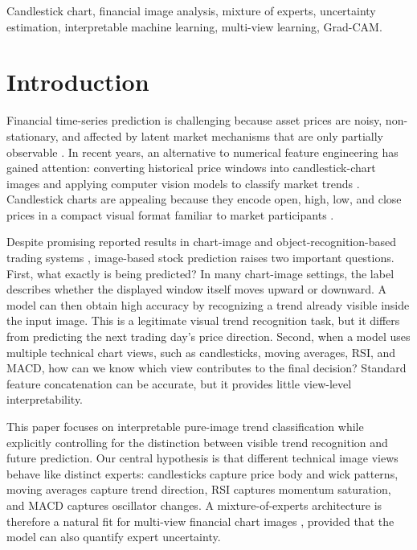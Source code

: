 ﻿\documentclass[conference]{IEEEtran}
\begin{document}
\begin{IEEEkeywords}
Candlestick chart, financial image analysis, mixture of experts, uncertainty estimation, interpretable machine learning, multi-view learning, Grad-CAM.
\end{IEEEkeywords}

\section{Introduction}

Financial time-series prediction is challenging because asset prices are noisy, non-stationary, and affected by latent market mechanisms that are only partially observable \cite{rouf2021stocksurvey,meng2021urts}. In recent years, an alternative to numerical feature engineering has gained attention: converting historical price windows into candlestick-chart images and applying computer vision models to classify market trends \cite{kusuma2019deepcandle,pizon2025image}. Candlestick charts are appealing because they encode open, high, low, and close prices in a compact visual format familiar to market participants \cite{mersal2023systematic}.

Despite promising reported results in chart-image and object-recognition-based trading systems \cite{nguyen2023object,temur2024comparison}, image-based stock prediction raises two important questions. First, what exactly is being predicted? In many chart-image settings, the label describes whether the displayed window itself moves upward or downward. A model can then obtain high accuracy by recognizing a trend already visible inside the input image. This is a legitimate visual trend recognition task, but it differs from predicting the next trading day's price direction. Second, when a model uses multiple technical chart views, such as candlesticks, moving averages, RSI, and MACD, how can we know which view contributes to the final decision? Standard feature concatenation can be accurate, but it provides little view-level interpretability.

This paper focuses on interpretable pure-image trend classification while explicitly controlling for the distinction between visible trend recognition and future prediction. Our central hypothesis is that different technical image views behave like distinct experts: candlesticks capture price body and wick patterns, moving averages capture trend direction, RSI captures momentum saturation, and MACD captures oscillator changes. A mixture-of-experts architecture is therefore a natural fit for multi-view financial chart images \cite{jacobs1991adaptive,shazeer2017outrageous,xin2024i2moe}, provided that the model can also quantify expert uncertainty.
\end{document}
